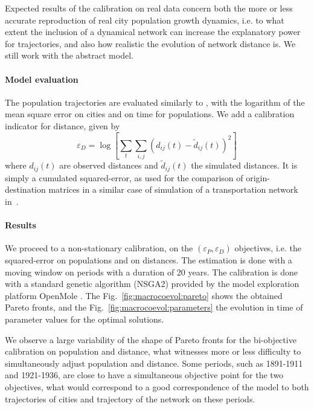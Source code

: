 Expected results of the calibration on real data concern both the more or less accurate reproduction of real city population growth dynamics, i.e. to what extent the inclusion of a dynamical network can increase the explanatory power for trajectories, and also how realistic the evolution of network distance is. We still work with the abstract model.


\paragraph{Model evaluation}


The population trajectories are evaluated similarly to \cite{raimbault2018indirect}, with the logarithm of the mean square error on cities and on time for populations. We add a calibration indicator for distance, given by
\[
\varepsilon_D = \log \left[ \sum_t \sum_{i,j} \left(d_{ij}(t) - \tilde{d}_{ij}(t)\right)^2\right]
\]
where $d_{ij}(t)$ are observed distances and $\tilde{d}_{ij}(t)$ the simulated distances. It is simply a cumulated squared-error, as used for the comparison of origin-destination matrices in a similar case of simulation of a transportation network in~\cite{jacobs2016transport}.



\paragraph{Results}

We proceed to a non-stationary calibration, on the $(\varepsilon_P,\varepsilon_D)$ objectives, i.e. the squared-error on populations and on distances. The estimation is done with a moving window on periods with a duration of 20 years. The calibration is done with a standard genetic algorithm (NSGA2) provided by the model exploration platform OpenMole \citep{reuillon2013openmole}. The Fig.~\ref{fig:macrocoevol:pareto} shows the obtained Pareto fronts, and the Fig.~\ref{fig:macrocoevol:parameters} the evolution in time of parameter values for the optimal solutions.

We observe a large variability of the shape of Pareto fronts for the bi-objective calibration on population and distance, what witnesses more or less difficulty to simultaneously adjust population and distance. Some periods, such as 1891-1911 and 1921-1936, are close to have a simultaneous objective point for the two objectives, what would correspond to a good correspondence of the model to both trajectories of cities and trajectory of the network on these periods. 


